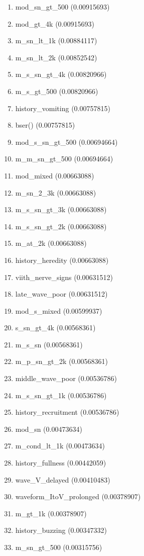 \begin{enumerate}
\item mod\_sn\_gt\_500 (0.00915693)
\item mod\_gt\_4k (0.00915693)
\item m\_sn\_lt\_1k (0.00884117)
\item m\_sn\_lt\_2k (0.00852542)
\item m\_s\_sn\_gt\_4k (0.00820966)
\item m\_s\_gt\_500 (0.00820966)
\item history\_vomiting (0.00757815)
\item bser() (0.00757815)
\item mod\_s\_sn\_gt\_500 (0.00694664)
\item m\_m\_sn\_gt\_500 (0.00694664)
\item mod\_mixed (0.00663088)
\item m\_sn\_2\_3k (0.00663088)
\item m\_s\_sn\_gt\_3k (0.00663088)
\item m\_s\_sn\_gt\_2k (0.00663088)
\item m\_at\_2k (0.00663088)
\item history\_heredity (0.00663088)
\item viith\_nerve\_signs (0.00631512)
\item late\_wave\_poor (0.00631512)
\item mod\_s\_mixed (0.00599937)
\item s\_sn\_gt\_4k (0.00568361)
\item m\_s\_sn (0.00568361)
\item m\_p\_sn\_gt\_2k (0.00568361)
\item middle\_wave\_poor (0.00536786)
\item m\_s\_sn\_gt\_1k (0.00536786)
\item history\_recruitment (0.00536786)
\item mod\_sn (0.00473634)
\item m\_cond\_lt\_1k (0.00473634)
\item history\_fullness (0.00442059)
\item wave\_V\_delayed (0.00410483)
\item waveform\_ItoV\_prolonged (0.00378907)
\item m\_gt\_1k (0.00378907)
\item history\_buzzing (0.00347332)
\item m\_sn\_gt\_500 (0.00315756)
\end{enumerate}